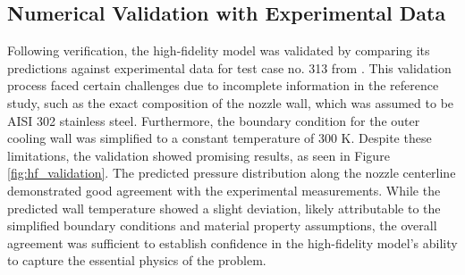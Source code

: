 \documentclass[tg, EN]{ufabcFHZh_tg}
\begin{document}
\subsection{Numerical Validation with Experimental Data}

Following verification, the high-fidelity model was validated by comparing its predictions against experimental data for test case no. 313 from \citep{back1964}. This validation process faced certain challenges due to incomplete information in the reference study, such as the exact composition of the nozzle wall, which was assumed to be AISI 302 stainless steel. Furthermore, the boundary condition for the outer cooling wall was simplified to a constant temperature of 300 K. Despite these limitations, the validation showed promising results, as seen in Figure \ref{fig:hf_validation}. The predicted pressure distribution along the nozzle centerline demonstrated good agreement with the experimental measurements. While the predicted wall temperature showed a slight deviation, likely attributable to the simplified boundary conditions and material property assumptions, the overall agreement was sufficient to establish confidence in the high-fidelity model's ability to capture the essential physics of the problem.
\end{document}
